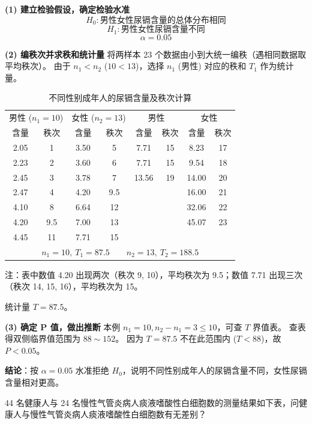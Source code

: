 \documentclass[lang=cn,10pt]{elegantbook}
\begin{document}
\vspace{0.2cm}
\begin{solution}
\textbf{(1) 建立检验假设，确定检验水准}
\[
H_0: \text{男性女性尿镉含量的总体分布相同}
\]
\[
H_1: \text{男性女性尿镉含量不同}
\]
\[
\alpha = 0.05
\]

\textbf{(2) 编秩次并求秩和统计量}
将两样本 23 个数据由小到大统一编秩（遇相同数据取平均秩次）。
由于 $n_1 < n_2$ ($10 < 13$)，选择 $n_1$ (男性) 对应的秩和 $T_1$ 作为统计量。

\begin{table}[htbp]
\centering
\caption{不同性别成年人的尿镉含量及秩次计算}
\begin{tabular}{cccc|cccc}
\toprule
\multicolumn{2}{c}{男性 ($n_1=10$)} & \multicolumn{2}{c|}{女性 ($n_2=13$)} & \multicolumn{2}{c}{男性} & \multicolumn{2}{c}{女性} \\
含量 & 秩次 & 含量 & 秩次 & 含量 & 秩次 & 含量 & 秩次 \\
\midrule
2.05 & 1 & 3.50 & 5 & 7.71 & 15 & 8.23 & 17 \\
2.23 & 2 & 3.60 & 6 & 7.71 & 15 & 9.54 & 18 \\
2.45 & 3 & 3.78 & 7 & 13.56 & 19 & 14.00 & 20 \\
2.47 & 4 & 4.20 & 9.5 & & & 16.00 & 21 \\
4.10 & 8 & 6.64 & 12 & & & 32.06 & 22 \\
4.20 & 9.5 & 7.00 & 13 & & & 45.07 & 23 \\
4.45 & 11 & 7.71 & 15 & & & & \\
\midrule
\multicolumn{8}{c}{$n_1=10,\ T_1=87.5 \qquad n_2=13,\ T_2=188.5$} \\
\bottomrule
\end{tabular}
\end{table}

注：表中数值 4.20 出现两次（秩次 9, 10），平均秩次为 9.5；数值 7.71 出现三次（秩次 14, 15, 16），平均秩次为 15。

统计量 $T = 87.5$。

\textbf{(3) 确定 P 值，做出推断}
本例 $n_1=10, n_2-n_1=3 \le 10$，可查 $T$ 界值表。
查表得双侧临界值范围为 $88 \sim 152$。
因为 $T = 87.5$ 不在此范围内 ($T < 88$)，故 $P < 0.05$。

\textbf{结论}：按 $\alpha=0.05$ 水准拒绝 $H_0$，说明不同性别成年人的尿镉含量不同，女性尿镉含量相对更高。
\end{solution}

\vspace{0.4cm}
\begin{exercise}[等级变量资料的秩和检验]
44 名健康人与 24 名慢性气管炎病人痰液嗜酸性白细胞数的测量结果如下表，问健康人与慢性气管炎病人痰液嗜酸性白细胞数有无差别？
\end{exercise}
\end{document}
